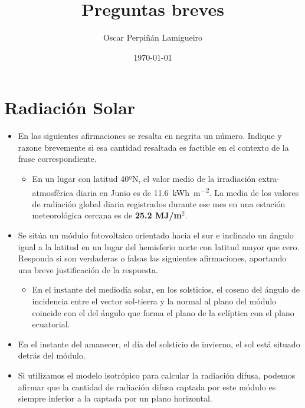 \documentclass[article, a4paper]{memoir}
\author{Oscar Perpiñán Lamigueiro}
\date{\today}
\title{Preguntas breves}
\begin{document}
\maketitle

\section*{Radiación Solar}
\label{sec:orgd76b38f}
\begin{itemize}
\item En las siguientes afirmaciones se resalta en negrita un
número. Indique y razone brevemente si esa cantidad resaltada es
factible en el contexto de la frase correspondiente.

\begin{itemize}
\item En un lugar con latitud 40ºN, el valor medio de la irradiación
extra-atmosférica diaria en Junio es de
\SI{11.6}{\kWh\per\meter\squared}. La media de los valores de
radiación global diaria registrados durante ese mes en una
estación meteorológica cercana es de \textbf{25.2 MJ/m\(^{\text{2}}\)}.
\end{itemize}

\item Se sitúa un módulo fotovoltaico orientado hacia el sur e inclinado
un ángulo igual a la latitud en un lugar del hemisferio norte con
latitud mayor que cero. Responda si son verdaderas o falsas las
siguientes afirmaciones, aportando una breve justificación de la
respuesta.
\begin{itemize}
\item En el instante del mediodía solar, en los solsticios, el coseno
del ángulo de incidencia entre el vector sol-tierra y la normal al
plano del módulo coincide con el del ángulo que forma el plano de
la eclíptica con el plano ecuatorial.
\end{itemize}
\end{itemize}

\begin{itemize}
\item En el instante del amanecer, el día del solsticio de invierno, el sol está situado detrás del módulo.
\end{itemize}

\begin{itemize}
\item Si utilizamos el modelo isotrópico para calcular la radiación
difusa, podemos afirmar que la cantidad de radiación difusa
captada por este módulo es siempre inferior a la captada por un
plano horizontal.
\end{itemize}
\end{document}
